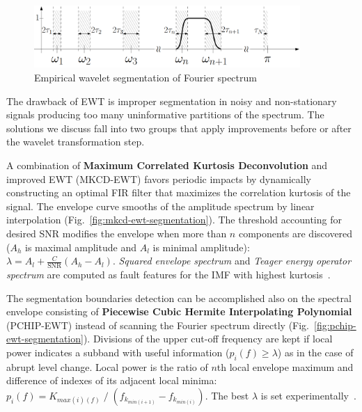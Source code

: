 \begin{figure}[ht]
    \centering
    \includegraphics[width=0.9\textwidth]{assets/analysis/EWT.png}
    \caption{Empirical wavelet segmentation of Fourier spectrum~\cite{gilles_empirical_2013}}
    \label{fig:ewt-spectrum-segmentation}
\end{figure}

The drawback of EWT is improper segmentation in noisy and non-stationary signals producing too many uninformative partitions of the spectrum. The solutions we discuss fall into two groups that apply improvements before or after the wavelet transformation step. 

A combination of \textbf{Maximum Correlated Kurtosis Deconvolution} and improved EWT (MKCD-EWT) favors periodic impacts by dynamically constructing an optimal FIR filter that maximizes the correlation kurtosis of the signal. The envelope curve smooths of the amplitude spectrum by linear interpolation (Fig.~\ref{fig:mkcd-ewt-segmentation}). The threshold accounting for desired SNR modifies the envelope when more than $n$ components are discovered ($A_h$ is maximal amplitude and $A_l$ is minimal amplitude): $\lambda = A_l + \frac{C}{\mathrm{SNR}}(A_h - A_l)$. \emph{Squared envelope spectrum} and \emph{Teager energy operator spectrum} are computed as fault features for the IMF with highest kurtosis~\cite{li_fault_2019}. 

The segmentation boundaries detection can be accomplished also on the spectral envelope consisting of \textbf{Piecewise Cubic Hermite Interpolating Polynomial} (PCHIP-EWT) instead of scanning the Fourier spectrum directly (Fig.~\ref{fig:pchip-ewt-segmentation}). Divisions of the upper cut-off frequency are kept if local power indicates a subband with useful information ($p_i(f) \geq \lambda$)  as in the case of abrupt level change. Local power is the ratio of $n$th local envelope maximum and difference of indexes of its adjacent local minima:  $p_i(f) = K_{max(i)(f)} \;/\;\left(f_{k_{min(i+1)}} - f_{k_{min(i)}}\right)$. The best $\lambda$ is set experimentally~\cite{zhuang_improved_2020}.


